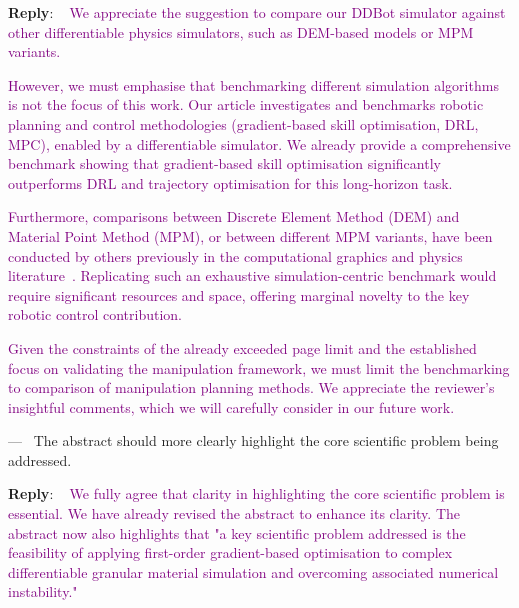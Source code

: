 \documentclass[11pt]{article}
\newcounter{reviewer}
\newcounter{point}[reviewer]
\newcounter{suggestion}
\renewcommand{\thepoint}{P\,\thereviewer.\arabic{point}}
\newenvironment{point}
   {\refstepcounter{point} \bigskip \noindent {\textbf{Reviewer~Point~\thepoint} } ---\ }
   {\par }
\newenvironment{reply}
   {\medskip \noindent \begin{sf}\textbf{Reply}: \  }
   {\medskip \end{sf}}
\newcommand{\rp}[1]{\textcolor{purple}{#1}}
\begin{document}
\begin{reply}
\rp{We appreciate the suggestion to compare our DDBot simulator against other differentiable physics simulators, such as DEM-based models or MPM variants.}

\rp{However, we must emphasise that benchmarking different simulation algorithms is not the focus of this work. Our article investigates and benchmarks robotic planning and control methodologies (gradient-based skill optimisation, DRL, MPC), enabled by a differentiable simulator. We already provide a comprehensive benchmark showing that gradient-based skill optimisation significantly outperforms DRL and trajectory optimisation for this long-horizon task.}

\rp{Furthermore, comparisons between Discrete Element Method (DEM) and Material Point Method (MPM), or between different MPM variants, have been conducted by others previously in the computational graphics and physics literature~\cite{hu2018moving, tran2020convected, jiang2020hybrid}. Replicating such an exhaustive simulation-centric benchmark would require significant resources and space, offering marginal novelty to the key robotic control contribution.}

\rp{Given the constraints of the already exceeded page limit and the established focus on validating the manipulation framework, we must limit the benchmarking to comparison of manipulation planning methods. We appreciate the reviewer’s insightful comments, which we will carefully consider in our future work.}
\end{reply}

\begin{point}
The abstract should more clearly highlight the core scientific
problem being addressed.
\end{point}
\begin{reply}
\rp{We fully agree that clarity in highlighting the core scientific problem is essential. We have already revised the abstract to enhance its clarity. The abstract now also highlights that "a key scientific problem addressed is the feasibility of applying first-order gradient-based optimisation to complex differentiable granular material simulation and overcoming associated numerical instability."}
\end{reply}
\end{document}
